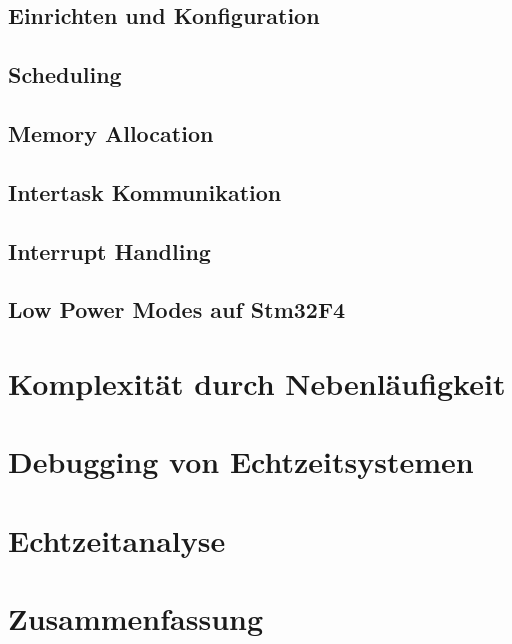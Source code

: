 \documentclass[ngerman]{seminarvorlage}
\begin{document}
\subsection{Einrichten und Konfiguration}
\label{sec:Einrichtung und Konfiguration}
\subsection{Scheduling}
\subsection{Memory Allocation}
\subsection{Intertask Kommunikation}
\subsection{Interrupt Handling}
\subsection{Low Power Modes auf Stm32F4}
\label{sec:Low Power Modes} 
\section{Komplexität durch Nebenläufigkeit}
\section{Debugging von Echtzeitsystemen} 
\label{sec:Debugging von Echtzeitsystemen}
\section{Echtzeitanalyse}
\label{sec:Echtzeitanalyse} 

 
\section{Zusammenfassung}
\pagebreak

\end{document}
